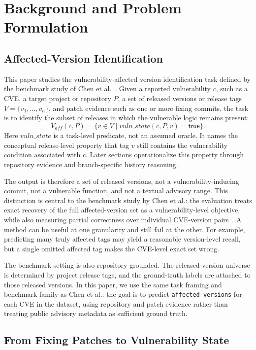\section{Background and Problem Formulation}
\label{sec:background}

\subsection{Affected-Version Identification}

This paper studies the vulnerability-affected version identification task defined by the benchmark study of Chen et al.~\cite{howfar2025}. Given a reported vulnerability $c$, such as a CVE, a target project or repository $P$, a set of released versions or release tags $V=\{v_1,\ldots,v_n\}$, and patch evidence such as one or more fixing commits, the task is to identify the subset of releases in which the vulnerable logic remains present:
\[
V_{\mathit{aff}}(c,P) = \{v \in V \mid \mathit{vuln\_state}(c,P,v)=\mathsf{true}\}.
\]
Here $\mathit{vuln\_state}$ is a task-level predicate, not an assumed oracle. It names the conceptual release-level property that tag $v$ still contains the vulnerability condition associated with $c$. Later sections operationalize this property through repository evidence and branch-specific history reasoning.

The output is therefore a set of released versions, not a vulnerability-inducing commit, not a vulnerable function, and not a textual advisory range. This distinction is central to the benchmark study by Chen et al.: the evaluation treats exact recovery of the full affected-version set as a vulnerability-level objective, while also measuring partial correctness over individual CVE-version pairs~\cite{howfar2025}. A method can be useful at one granularity and still fail at the other. For example, predicting many truly affected tags may yield a reasonable version-level recall, but a single omitted affected tag makes the CVE-level exact set wrong.

The benchmark setting is also repository-grounded. The released-version universe is determined by project release tags, and the ground-truth labels are attached to those released versions. In this paper, we use the same task framing and benchmark family as Chen et al.: the goal is to predict \texttt{affected\_versions} for each CVE in the dataset, using repository and patch evidence rather than treating public advisory metadata as sufficient ground truth.

\subsection{From Fixing Patches to Vulnerability State}

